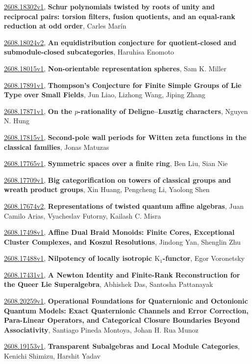 \documentclass[9pt, a4paper]{article}
\theoremstyle{plain}
\theoremstyle{definition}
\theoremstyle{remark}
\newcommand{\arxiv}[3]{\href{https://arxiv.org/abs/#1}{#1}, \textbf{\textcolor{arxivblue}{#2}}, #3}
\begin{document}
\arxiv{2608.18302v1}{Schur polynomials twisted by roots of unity and reciprocal pairs: torsion filters, fusion quotients, and an equal-rank reduction at odd order}{Carles Marín}

\arxiv{2608.18024v2}{An equidistribution conjecture for quotient-closed and submodule-closed subcategories}{Haruhisa Enomoto}

\arxiv{2608.18015v1}{Non-orientable representation spheres}{Sam K. Miller}

\arxiv{2608.17891v1}{Thompson's Conjecture for Finite Simple Groups of Lie Type over Small Fields}{Jun Liao, Lizhong Wang, Jiping Zhang}

\arxiv{2608.17871v1}{On the $p$-rationality of Deligne--Lusztig characters}{Nguyen N. Hung}

\arxiv{2608.17815v1}{Second-pole wall periods for Witten zeta functions in the classical families}{Jonas Matuzas}

\arxiv{2608.17765v1}{Symmetric spaces over a finite ring}{Ben Liu, Sian Nie}

\arxiv{2608.17709v1}{Big categorification on towers of classical groups and wreath product groups}{Xin Huang, Pengcheng Li, Yaolong Shen}

\arxiv{2608.17674v2}{Representations of twisted quantum affine algebras}{Juan Camilo Arias, Vyacheslav Futorny, Kailash C. Misra}

\arxiv{2608.17498v1}{Affine Dual Braid Monoids: Finite Cores, Exceptional Cluster Complexes, and Koszul Resolutions}{Jindong Yan, Shenglin Zhu}

\arxiv{2608.17488v1}{Nilpotency of locally isotropic $ \mathrm{K}_1 $-functor}{Egor Voronetsky}

\arxiv{2608.17431v1}{A Newton Identity and Finite-Rank Reconstruction for the Queer Lie Superalgebra}{Abhishek Das, Santosha Pattanayak}

\arxiv{2608.20259v1}{Operational Foundations for Quaternionic and Octonionic Quantum Models: Exact Quaternionic Channels and Error Correction, Para-Linear Operators, and Categorical Closure Boundaries Beyond Associativity}{Santiago Pineda Montoya, Johan H. Rua Munoz}

\arxiv{2608.19153v1}{Transparent Subalgebras and Local Module Categories}{Kenichi Shimizu, Harshit Yadav}

\end{document}
